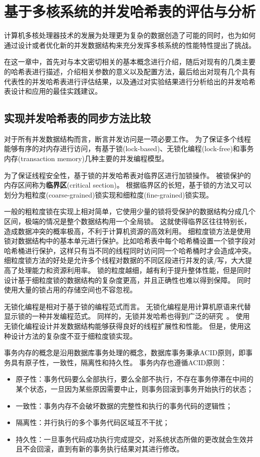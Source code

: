\chapter{基于多核系统的并发哈希表的评估与分析}
\label{chap:chts}

计算机多核处理器技术的发展为处理更为复杂的数据创造了可能的同时，也为如何通过设计或者优化新的并发数据结构来充分发挥多核系统的性能特性提出了挑战。

在这一章中，首先对与本文密切相关的基本概念进行介绍，随后对现有的几类主要的哈希表进行描述，介绍相关参数的意义以及配置方法，最后给出对现有几个具有代表性的并发哈希表进行评估结果，以及通过对实验结果进行分析给出的并发哈希表设计和应用的最佳实践建议。

\section{实现并发哈希表的同步方法比较}

对于所有并发数据结构而言，断言并发访问是一项必要工作。
为了保证多个线程能够有序的对内存进行访问，有基于锁(lock-based)、无锁化编程(lock-free)和事务内存(transaction memory)几种主要的并发编程模型。

为了保证线程安全性，基于锁的并发哈希表对临界区进行加锁操作。
被锁保护的内存区间称为\textbf{临界区}(critical section)。
根据临界区的长短，基于锁的方法又可以划分为粗粒度(coarse-grained)锁实现和细粒度(fine-grained)锁实现。

一般的粗粒度锁在实现上相对简单，它使用少量的锁将受保护的数据结构分成几个区间，极端的情况是整个数据结构用一个全局锁。
这就使得临界区往往特别长，造成数据冲突的概率极高，不利于计算机资源的高效利用。
细粒度锁方法是使用锁对数据结构中的基本单元进行保护。比如哈希表中每个哈希桶设置一个锁字段对哈希桶进行保护，这样只有当不同的线程同时访问同一个哈希桶时才会造成冲突。
细粒度锁方法的好处是允许多个线程对数据的不同区段进行并发的读/写，大大提高了处理能力和资源利用率。
锁的粒度越细，越有利于提升整体性能，但是同时设计基于细粒度锁的数据结构的复杂度更高，并且正确性也难以得到保障。
同时使用大量的锁占用的存储空间也不容忽视。

无锁化编程是相对于基于锁的编程范式而言。
无锁化编程是用计算机原语来代替显示锁的一种并发编程范式。
同样的，无锁并发哈希也得到广泛的研究~\cite{urcu, nonblocking,metreveli2012cphash}。
使用无锁化编程设计并发数据结构能够获得良好的线程扩展性和性能。
但是，使用这种设计方法的复杂度不亚于细粒度锁实现。

事务内存的概念是沿用数据库事务处理的概念，数据库事务秉承ACID原则，即事务具有原子性，一致性，隔离性和持久性。
事务内存也遵循ACID原则：
\begin{itemize}
  \item 原子性：事务代码要么全部执行，要么全部不执行，不存在事务停滞在中间的某个状态，一旦因为某些原因需要中止，则事务回滚到事务开始执行的状态；
  \item 一致性：事务内存不会破坏数据的完整性和执行的事务代码的逻辑性；
  \item 隔离性：并行执行的多个事务代码区域互不干扰；
  \item 持久性：一旦事务代码成功执行完成提交，对系统状态所做的更改就会生效并且不会回滚，直到有新的事务执行结果对其进行修改。
\end{itemize}

